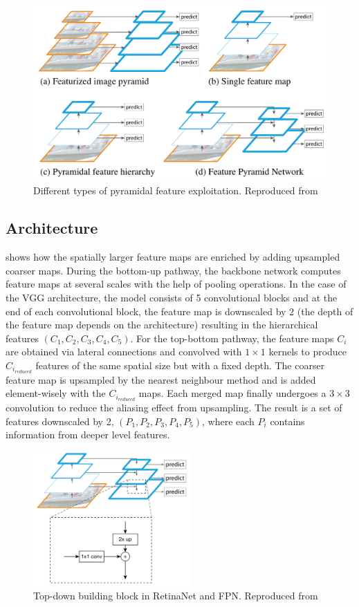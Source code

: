 \begin{figure}[!htb]
  \centering
  \includegraphics[width=12cm]{figures/ch2/fig9.png}
  \caption{Different types of pyramidal feature exploitation. Reproduced from \cite{lin2017feature}}
  \label{fig9}
\end{figure} 

\subsection{Architecture}
 shows how the spatially larger feature maps are enriched by adding upsampled coarser maps. During the bottom-up pathway, the backbone network computes feature maps at several scales with the help of pooling operations. In the case of the VGG architecture, the model consists of 5 convolutional blocks and at the end of each convolutional block, the feature map is downscaled by 2 (the depth of the feature map depends on the architecture) resulting in the hierarchical features $(C_1, C_2, C_3, C_4, C_5)$. For the top-bottom pathway, the feature maps $C_i$ are obtained via lateral connections and convolved with $1\times1$ kernels to produce $C_{i_{reduced}}$ features of the same spatial size but with a fixed depth. The coarser feature map is upsampled by the nearest neighbour method and is added element-wisely with the $C_{i_{reduced}}$ maps. Each merged map finally undergoes a $3\times3$ convolution to reduce the aliasing effect from upsampling. The result is a set of features downscaled by 2, $(P_1,P_2,P_3,P_4,P_5)$, where each $P_i$ contains information from deeper level features. 

\begin{figure}[!htb]
  \centering
  \includegraphics[width=6cm]{figures/ch2/fig10.png}
  \caption{Top-down building block in RetinaNet and FPN. Reproduced from \cite{lin2017feature}}
  \label{fig10}
\end{figure} 

